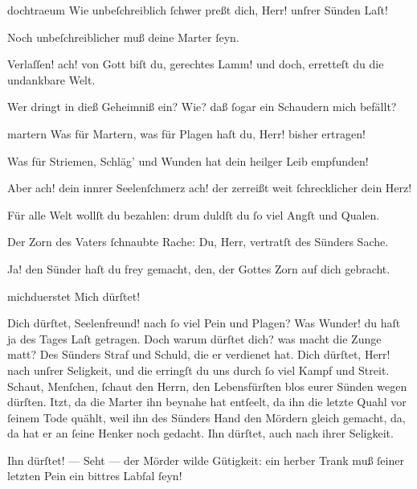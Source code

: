 \documentclass{ees}
\begin{document}
{\begin{movement}{dochtraeum}
    \voice[Lazarus]
    Wie unbeſchreiblich ſchwer preßt dich, Herr! unſrer Sünden Laſt!

    \voice[Eidli]
    Noch unbeſchreiblicher muß deine Marter ſeyn.

    Verlaſſen! ach! von Gott biſt du, gerechtes Lamm!
    und doch, erretteſt du die undankbare Welt.

    Wer dringt in dieß Geheimniß ein?
    Wie? daß ſogar ein Schaudern mich befällt?
  \end{movement}

  \begin{movement}{martern}
    \voice[Maria]
    Was für Martern, was für Plagen
    haſt du, Herr! bisher ertragen!

    \voice[Johannes]
    Was für Striemen, Schläg’ und Wunden
    hat dein heilger Leib empfunden!

    Aber ach! dein innrer Seelenſchmerz
    ach! der zerreißt weit ſchrecklicher dein Herz!

    \voice[Maria]
    Für alle Welt wollſt du bezahlen:
    drum duldſt du ſo viel Angſt und Qualen.

    \voice[Johannes]
    Der Zorn des Vaters ſchnaubte Rache:
    Du, Herr, vertratſt des Sünders Sache.

    Ja! den Sünder haſt du frey gemacht,
    den, der Gottes Zorn auf dich gebracht.
  \end{movement}

  \begin{movement}{michduerstet}
    \voice[Jeſus]
    Mich dürſtet!

    \voice[Johannes]
    Dich dürſtet, Seelenfreund! nach ſo viel Pein und Plagen?
    Was Wunder! du haſt ja des Tages Laſt getragen.
    Doch warum dürſtet dich? was macht die Zunge matt?
    Des Sünders Straf und Schuld, die er verdienet hat.
    Dich dürſtet, Herr! nach unſrer Seligkeit,
    und die erringſt du uns durch ſo viel Kampf und Streit.
    Schaut, Menſchen, ſchaut den Herrn, den Lebensfürſten
    blos eurer Sünden wegen dürſten.
    Itzt, da die Marter ihn beynahe hat entſeelt,
    da ihn die letzte Quahl vor ſeinem Tode quählt,
    weil ihn des Sünders Hand den Mördern gleich gemacht,
    da, da hat er an ſeine Henker noch gedacht.
    Ihn dürſtet, auch nach ihrer Seligkeit.

    \voice[Maria]
    Ihn dürſtet! — Seht — der Mörder wilde Gütigkeit:
    ein herber Trank muß ſeiner letzten Pein
    ein bittres Labſal ſeyn!
  \end{movement}

}

\eesScore
\end{document}
